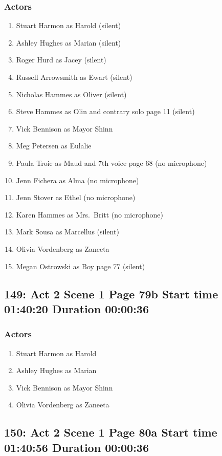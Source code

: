 \subsubsection{Actors}
\begin{enumerate}
\item Stuart Harmon as Harold (silent)
\item Ashley Hughes as Marian (silent)
\item Roger Hurd as Jacey (silent)
\item Russell Arrowsmith as Ewart (silent)
\item Nicholas Hammes as Oliver (silent)
\item Steve Hammes as Olin and contrary solo page 11 (silent)
\item Vick Bennison as Mayor Shinn
\item Meg Petersen as Eulalie
\item Paula Troie as Maud and 7th voice page 68 (no microphone)
\item Jenn Fichera as Alma (no microphone)
\item Jenn Stover as Ethel (no microphone)
\item Karen Hammes as Mrs.~Britt (no microphone)
\item Mark Sousa as Marcellus (silent)
\item Olivia Vordenberg as Zaneeta
\item Megan Ostrowski as Boy page 77 (silent)
\end{enumerate}


\subsection{149: Act 2 Scene 1 Page 79b Start time 01:40:20 Duration 00:00:36}

\subsubsection{Actors}
\begin{enumerate}
\item Stuart Harmon as Harold
\item Ashley Hughes as Marian
\item Vick Bennison as Mayor Shinn
\item Olivia Vordenberg as Zaneeta
\end{enumerate}


\subsection{150: Act 2 Scene 1 Page 80a Start time 01:40:56 Duration 00:00:36}

